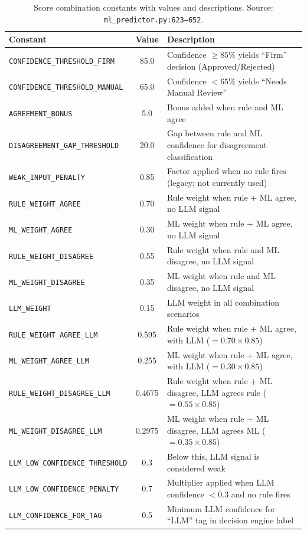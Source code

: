 \documentclass[10pt,a4paper]{article}
\begin{document}
\begin{table}[H]
\centering
\caption{Score combination constants with values and descriptions. Source: \texttt{ml\_predictor.py:623--652}.}
\label{tab:combination-constants}
\begin{tabular}{lcR{7cm}}
\toprule
\textbf{Constant} & \textbf{Value} & \textbf{Description} \\
\midrule
\texttt{CONFIDENCE\_THRESHOLD\_FIRM}   & 85.0  & Confidence $\geq 85\%$ yields ``Firm'' decision (Approved/Rejected) \\
\texttt{CONFIDENCE\_THRESHOLD\_MANUAL} & 65.0  & Confidence $< 65\%$ yields ``Needs Manual Review'' \\
\texttt{AGREEMENT\_BONUS}              & 5.0   & Bonus added when rule and ML agree \\
\texttt{DISAGREEMENT\_GAP\_THRESHOLD}  & 20.0  & Gap between rule and ML confidence for disagreement classification \\
\texttt{WEAK\_INPUT\_PENALTY}          & 0.85  & Factor applied when no rule fires (legacy; not currently used) \\
\midrule
\texttt{RULE\_WEIGHT\_AGREE}           & 0.70  & Rule weight when rule + ML agree, no LLM signal \\
\texttt{ML\_WEIGHT\_AGREE}             & 0.30  & ML weight when rule + ML agree, no LLM signal \\
\texttt{RULE\_WEIGHT\_DISAGREE}        & 0.55  & Rule weight when rule and ML disagree, no LLM signal \\
\texttt{ML\_WEIGHT\_DISAGREE}          & 0.35  & ML weight when rule and ML disagree, no LLM signal \\
\midrule
\texttt{LLM\_WEIGHT}                   & 0.15  & LLM weight in all combination scenarios \\
\texttt{RULE\_WEIGHT\_AGREE\_LLM}      & 0.595 & Rule weight when rule + ML agree, with LLM ($= 0.70 \times 0.85$) \\
\texttt{ML\_WEIGHT\_AGREE\_LLM}        & 0.255 & ML weight when rule + ML agree, with LLM ($= 0.30 \times 0.85$) \\
\texttt{RULE\_WEIGHT\_DISAGREE\_LLM}   & 0.4675 & Rule weight when rule + ML disagree, LLM agrees rule ($= 0.55 \times 0.85$) \\
\texttt{ML\_WEIGHT\_DISAGREE\_LLM}     & 0.2975 & ML weight when rule + ML disagree, LLM agrees ML ($= 0.35 \times 0.85$) \\
\midrule
\texttt{LLM\_LOW\_CONFIDENCE\_THRESHOLD} & 0.3 & Below this, LLM signal is considered weak \\
\texttt{LLM\_LOW\_CONFIDENCE\_PENALTY}   & 0.7 & Multiplier applied when LLM confidence $< 0.3$ and no rule fires \\
\texttt{LLM\_CONFIDENCE\_FOR\_TAG}       & 0.5 & Minimum LLM confidence for ``LLM'' tag in decision engine label \\
\bottomrule
\end{tabular}
\end{table}
\end{document}
